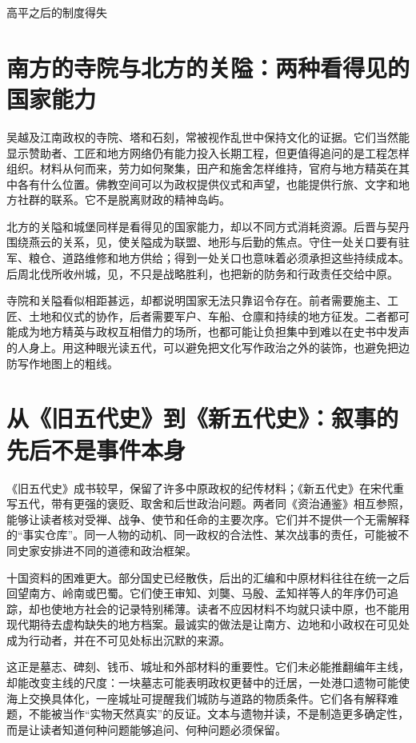 \begin{causalchain}{高平之后的制度得失}
\section{南方的寺院与北方的关隘：两种看得见的国家能力}

吴越及江南政权的寺院、塔和石刻，常被视作乱世中保持文化的证据。它们当然能显示赞助者、工匠和地方网络仍有能力投入长期工程，但更值得追问的是工程怎样组织。材料从何而来，劳力如何聚集，田产和施舍怎样维持，官府与地方精英在其中各有什么位置。佛教空间可以为政权提供仪式和声望，也能提供行旅、文字和地方社群的联系。它不是脱离财政的精神岛屿。

北方的关隘和城堡同样是看得见的国家能力，却以不同方式消耗资源。后晋与契丹围绕燕云的关系，见，使关隘成为联盟、地形与后勤的焦点。守住一处关口要有驻军、粮仓、道路维修和地方供给；得到一处关口也意味着必须承担这些持续成本。后周北伐所收州城，见，不只是战略胜利，也把新的防务和行政责任交给中原。

寺院和关隘看似相距甚远，却都说明国家无法只靠诏令存在。前者需要施主、工匠、土地和仪式的协作，后者需要军户、车船、仓廪和持续的地方征发。二者都可能成为地方精英与政权互相借力的场所，也都可能让负担集中到难以在史书中发声的人身上。用这种眼光读五代，可以避免把文化写作政治之外的装饰，也避免把边防写作地图上的粗线。

\section{从《旧五代史》到《新五代史》：叙事的先后不是事件本身}

《旧五代史》成书较早，保留了许多中原政权的纪传材料；《新五代史》在宋代重写五代，带有更强的褒贬、取舍和后世政治问题。两者同《资治通鉴》相互参照，能够让读者核对受禅、战争、使节和任命的主要次序。它们并不提供一个无需解释的“事实仓库”。同一人物的动机、同一政权的合法性、某次战事的责任，可能被不同史家安排进不同的道德和政治框架。

十国资料的困难更大。部分国史已经散佚，后出的汇编和中原材料往往在统一之后回望南方、岭南或巴蜀。它们使王审知、刘龑、马殷、孟知祥等人的年序仍可追踪，却也使地方社会的记录特别稀薄。读者不应因材料不均就只读中原，也不能用现代期待去虚构缺失的地方档案。最诚实的做法是让南方、边地和小政权在可见处成为行动者，并在不可见处标出沉默的来源。

这正是墓志、碑刻、钱币、城址和外部材料的重要性。它们未必能推翻编年主线，却能改变主线的尺度：一块墓志可能表明政权更替中的迁居，一处港口遗物可能使海上交换具体化，一座城址可提醒我们城防与道路的物质条件。它们各有解释难题，不能被当作“实物天然真实”的反证。文本与遗物并读，不是制造更多确定性，而是让读者知道何种问题能够追问、何种问题必须保留。


\end{causalchain}
